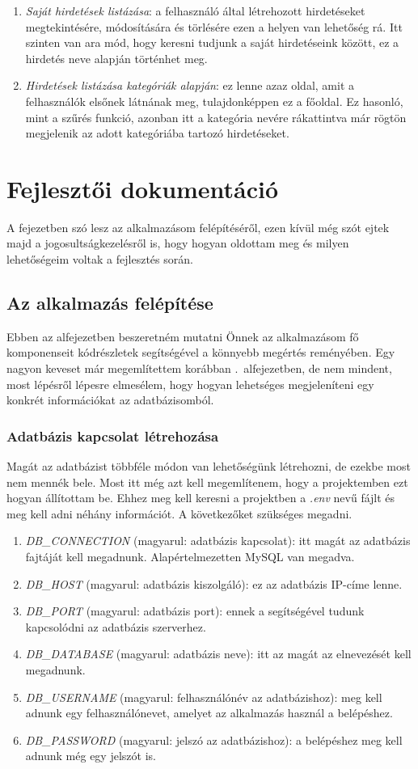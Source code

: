 \documentclass[]{thesis-ekf}
\theoremstyle{definition}
\theoremstyle{remark}
\begin{document}
\begin{enumerate}
			\item \emph{Saját hirdetések listázása}: a felhasználó által létrehozott hirdetéseket megtekintésére, módosítására és törlésére ezen a helyen van lehetőség rá. Itt szinten van ara mód, hogy keresni tudjunk a saját hirdetéseink között, ez a hirdetés neve alapján történhet meg.
			\item \emph{Hirdetések listázása kategóriák alapján}: ez lenne azaz oldal, amit a felhasználók elsőnek látnának meg, tulajdonképpen ez a főoldal. Ez hasonló, mint a szűrés funkció, azonban itt a kategória nevére rákattintva már rögtön megjelenik az adott kategóriába tartozó hirdetéseket.
		\end{enumerate}
	
	\chapter{Fejlesztői dokumentáció}
		A fejezetben szó lesz az alkalmazásom felépítéséről, ezen kívül még szót ejtek majd a jogosultságkezelésről is, hogy hogyan oldottam meg és milyen lehetőségeim voltak a fejlesztés során.
	\section{Az alkalmazás felépítése}
		Ebben az alfejezetben beszeretném mutatni Önnek az alkalmazásom fő komponenseit kódrészletek segítségével a könnyebb megértés reményében. Egy nagyon keveset már megemlítettem korábban .~alfejezetben, de nem mindent, most lépésről lépesre elmesélem, hogy hogyan lehetséges megjeleníteni egy konkrét információkat az adatbázisomból.
	\subsection{Adatbázis kapcsolat létrehozása}
		Magát az adatbázist többféle módon van lehetőségünk létrehozni, de ezekbe most nem mennék bele. Most itt még azt kell megemlítenem, hogy a projektemben ezt hogyan állítottam be. Ehhez meg kell keresni a projektben a \emph{.env} nevű fájlt és meg kell adni néhány információt. A következőket szükséges megadni.
		\begin{enumerate}
			\item \emph{DB\_CONNECTION} (magyarul: adatbázis kapcsolat): itt magát az adatbázis fajtáját kell megadnunk. Alapértelmezetten MySQL van megadva. 
			\item \emph{DB\_HOST} (magyarul: adatbázis kiszolgáló): ez az adatbázis IP-címe lenne.
			\item \emph{DB\_PORT} (magyarul: adatbázis port): ennek a segítségével tudunk kapcsolódni az adatbázis szerverhez. 
			\item \emph{DB\_DATABASE} (magyarul: adatbázis neve): itt az magát az elnevezését kell megadnunk.
			\item \emph{DB\_USERNAME} (magyarul: felhasználónév az adatbázishoz): meg kell adnunk egy felhasználónevet, amelyet az alkalmazás használ a belépéshez.
			\item \emph{DB\_PASSWORD} (magyarul: jelszó az adatbázishoz): a belépéshez meg kell adnunk még egy jelszót is.
		\end{enumerate}
\end{document}

